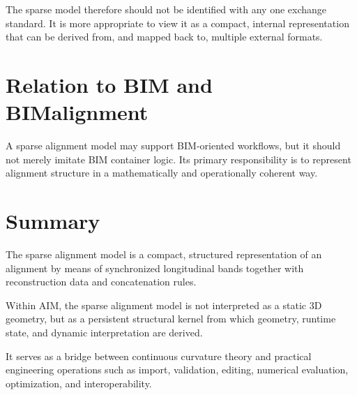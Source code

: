 The sparse model therefore should not be identified with any one
exchange standard. It is more appropriate to view it as a compact,
internal representation that can be derived from, and mapped back to,
multiple external formats.


\section{Relation to BIM and BIMalignment}

A sparse alignment model may support BIM-oriented workflows, but it
should not merely imitate BIM container logic.
Its primary responsibility is to represent alignment structure in a
mathematically and operationally coherent way.


\section{Summary}

\begin{summary}
The sparse alignment model is a compact, structured representation of an
alignment by means of synchronized longitudinal bands together with
reconstruction data and concatenation rules.

Within AIM, the sparse alignment model is not interpreted as a static
3D geometry, but as a persistent structural kernel from which geometry,
runtime state, and dynamic interpretation are derived.

It serves as a bridge between continuous curvature theory and practical
engineering operations such as import, validation, editing, numerical
evaluation, optimization, and interoperability.
\end{summary}
